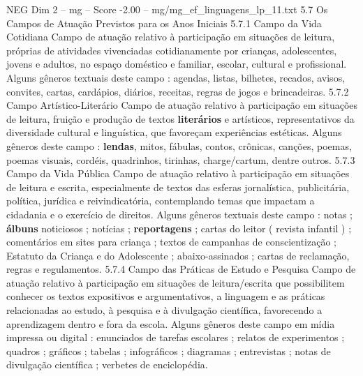\begin{textsample}{NEG Dim 2 – mg – Score -2.00 – mg/mg\_ef\_linguagens\_lp\_11.txt}  \label{ex:f2_neg_095}
5.7 Os Campos de Atuação Previstos para os Anos Iniciais 5.7.1 Campo da Vida Cotidiana Campo de atuação relativo à participação em situações de leitura, próprias de atividades vivenciadas cotidianamente por crianças, adolescentes, jovens e adultos, no espaço doméstico e familiar, escolar, cultural e profissional.
Alguns gêneros textuais deste campo : agendas, listas, bilhetes, recados, avisos, convites, cartas, cardápios, diários, receitas, regras de jogos e brincadeiras. 5.7.2 Campo Artístico-Literário Campo de atuação relativo à participação em situações de leitura, fruição e produção de textos \textbf{literários} e artísticos, representativos da diversidade cultural e linguística, que favoreçam experiências estéticas.
Alguns gêneros deste campo : \textbf{lendas}, mitos, fábulas, contos, crônicas, canções, poemas, poemas visuais, cordéis, quadrinhos, tirinhas, charge/cartum, dentre outros. 5.7.3 Campo da Vida Pública Campo de atuação relativo à participação em situações de leitura e escrita, especialmente de textos das esferas jornalística, publicitária, política, jurídica e reivindicatória, contemplando temas que impactam a cidadania e o exercício de direitos.
Alguns gêneros textuais deste campo : notas ; \textbf{álbuns} noticiosos ; notícias ; \textbf{reportagens} ; cartas do leitor ( revista infantil ) ; comentários em sites para criança ; textos de campanhas de conscientização ; Estatuto da Criança e do Adolescente ; abaixo-assinados ; cartas de reclamação, regras e regulamentos. 5.7.4 Campo das Práticas de Estudo e Pesquisa Campo de atuação relativo à participação em situações de leitura/escrita que possibilitem conhecer os textos expositivos e argumentativos, a linguagem e as práticas relacionadas ao estudo, à pesquisa e à divulgação científica, favorecendo a aprendizagem dentro e fora da escola.
Alguns gêneros deste campo em mídia impressa ou digital : enunciados de tarefas escolares ; relatos de experimentos ; quadros ; gráficos ; tabelas ; infográficos ; diagramas ; entrevistas ; notas de divulgação científica ; verbetes de enciclopédia.

\end{textsample}
